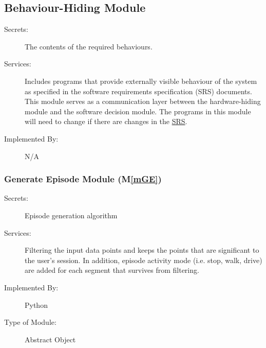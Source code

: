 \documentclass[12pt, titlepage]{article}
\newcommand{\mref}[1]{M\ref{#1}}
\begin{document}
\subsection{Behaviour-Hiding Module}

\begin{description}
\item[Secrets:]The contents of the required behaviours.
\item[Services:]Includes programs that provide externally visible behaviour of
  the system as specified in the software requirements specification (SRS)
  documents. This module serves as a communication layer between the
  hardware-hiding module and the software decision module. The programs in this
  module will need to change if there are changes in the \href{https://github.com/NicLobo/Capstone-yoGERT/blob/main/docs/SRS/SRS.pdf}{SRS}.
\item[Implemented By:] N/A
\end{description}


\subsubsection{Generate Episode Module (\mref{mGE})}
\begin{description}
\item[Secrets:]Episode generation algorithm
\item[Services:]Filtering the input data points and keeps the points that are significant to the user's session. In addition, episode activity mode (i.e. stop, walk, drive) are added for each segment that survives from filtering.
\item[Implemented By:] Python
\item[Type of Module:] Abstract Object %
\end{description}
\end{document}
